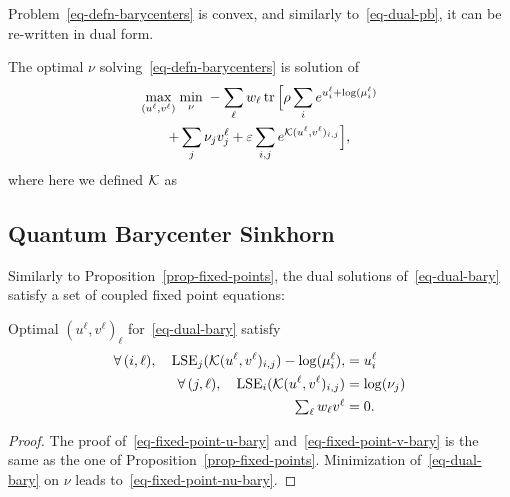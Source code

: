Problem~\eqref{eq-defn-barycenters} is convex, and similarly to~\eqref{eq-dual-pb}, it can be re-written in dual form.

\begin{prop}
The optimal $\nu$ solving~\eqref{eq-defn-barycenters} is solution of
\begin{multline}\label{eq-dual-bary}		
		\underset{(u^\ell,v^\ell)}{\max}\; \underset{\nu}{\min}\;
				- 
				\sum_\ell w_\ell 
					\operatorname{tr}\Big[
						\rho \sum_i e^{u_i^\ell+\log(\mu_i^\ell)} \\
					+    \sum_j \nu_j v_j^\ell
					+    \varepsilon \sum_{i,j}  e^{ \mathcal{K}(u^\ell,v^\ell)_{i,j} }
			 \Big], 
\end{multline}	
where here we defined $\mathcal{K}$ as
\end{prop}

%



\subsection{Quantum Barycenter Sinkhorn}

Similarly to Proposition~\ref{prop-fixed-points}, the dual solutions of~\eqref{eq-dual-bary} satisfy a set of coupled fixed point equations:


\begin{prop}
Optimal $(u^\ell,v^\ell)_\ell$ for~\eqref{eq-dual-bary} satisfy 
\begin{align}
	\forall \, (i,\ell), \quad \operatorname{LSE}_j(\mathcal{K}(u^\ell,v^\ell)_{i,j})-\log(\mu_i^\ell), \label{eq-fixed-point-u-bary} 
		&= u_i^\ell \\
	\forall \, (j,\ell), \quad \operatorname{LSE}_i(\mathcal{K}(u^\ell,v^\ell)_{i,j}) \label{eq-fixed-point-v-bary}
		&= \log(\nu_j)\\ 
		 \textstyle \sum_\ell w_\ell v^\ell &= 0. \label{eq-fixed-point-nu-bary}
\end{align}
\end{prop}
\begin{proof}
The proof of~\eqref{eq-fixed-point-u-bary} and~\eqref{eq-fixed-point-v-bary} is the same as the one of Proposition~\ref{prop-fixed-points}.
Minimization of~\eqref{eq-dual-bary} on $\nu$ leads to~\eqref{eq-fixed-point-nu-bary}. 
\end{proof}

